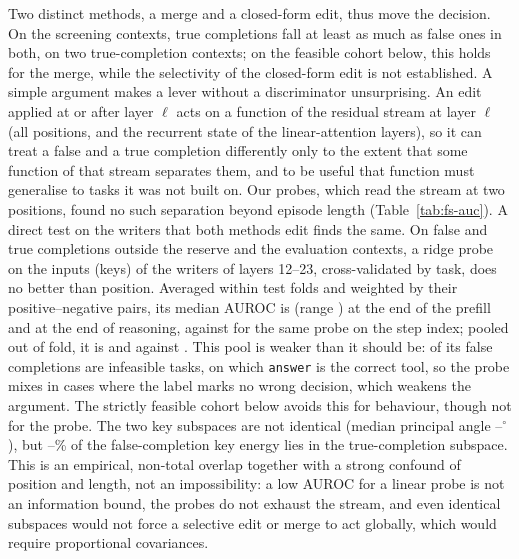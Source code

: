 Two distinct methods, a merge and a closed-form edit, thus move the decision. On the screening contexts, true completions fall at least as much as false ones in both, on two true-completion contexts; on the feasible cohort below, this holds for the merge, while the selectivity of the closed-form edit is not established. A simple argument makes a lever without a discriminator unsurprising. An edit applied at or after layer $\ell$ acts on a function of the residual stream at layer $\ell$ (all positions, and the recurrent state of the linear-attention layers), so it can treat a false and a true completion differently only to the extent that some function of that stream separates them, and to be useful that function must generalise to tasks it was not built on. Our probes, which read the stream at two positions, found no such separation beyond episode length (Table~\ref{tab:fs-auc}).
A direct test on the writers that both methods edit finds the same. On \rmFsp{} false and \rmFsm{} true completions outside the reserve and the evaluation contexts, a ridge probe on the inputs (keys) of the \rmWriters{} writers of layers 12--23, cross-validated by task, does no better than position. Averaged within test folds and weighted by their \rmPairs{} positive--negative pairs, its median AUROC is \rmPreAuc{} (range \rmPreRange) at the end of the prefill and \rmEndAuc{} at the end of reasoning, against \rmBaseStep{} for the same probe on the step index; pooled out of fold, it is \rmPreOof{} and \rmEndOof{} against \rmBaseStepOof. %
This pool is weaker than it should be: \rmFspInfeasible{} of its \rmFsp{} false completions are infeasible tasks, on which \texttt{answer} is the correct tool, so the probe mixes in cases where the label marks no wrong decision, which weakens the argument. The strictly feasible cohort below avoids this for behaviour, though not for the probe. %
The two key subspaces are not identical (median principal angle \rmPreAngle--\rmEndAngle$^\circ$), but \rmEndEnergy--\rmPreEnergy\% of the false-completion key energy lies in the true-completion subspace. This is an empirical, non-total overlap together with a strong confound of position and length, not an impossibility: a low AUROC for a linear probe is not an information bound, the probes do not exhaust the stream, and even identical subspaces would not force a selective edit or merge to act globally, which would require proportional covariances. %

